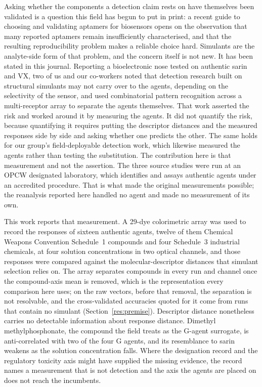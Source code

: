 \documentclass[journal=jacsat,manuscript=article,margin=1in]{achemso}
\begin{document}
Asking whether the components a detection claim rests on have themselves
been validated is a question this field has begun to put in print: a recent
guide to choosing and validating aptamers for biosensors opens on the
observation that many reported aptamers remain insufficiently characterised,
and that the resulting reproducibility problem makes a reliable choice
hard.\cite{chen2026aptamer} Simulants are the analyte-side form of that
problem, and the concern itself is not new. It has been stated in this
journal.
Reporting a bioelectronic nose tested on authentic sarin and VX, two of us
and our co-workers noted that detection research built on structural
simulants may not carry over to the agents, depending on the selectivity of
the sensor, and used combinatorial pattern recognition across a
multi-receptor array to separate the agents
themselves.\cite{yoo2025bioelectronic} That work asserted the risk and
worked around it by measuring the agents. It did not quantify the risk,
because quantifying it requires putting the descriptor distances and the
measured responses side by side and asking whether one predicts the other.
The same holds for our group's field-deployable detection work, which
likewise measured the agents rather than testing the
substitution.\cite{ondeviceref} The contribution here is that measurement
and not the assertion. The three source studies were run at an
OPCW designated laboratory, which identifies and assays authentic agents
under an accredited procedure. That is what made the original measurements
possible; the reanalysis reported here handled no agent and made no
measurement of its own.

This work reports that measurement. A 29-dye colorimetric array was used to
record the responses of sixteen authentic agents, twelve of them
Chemical Weapons Convention Schedule~1 compounds and four Schedule~3
industrial chemicals, at four solution concentrations in two optical
channels, and those responses were compared against the
molecular-descriptor distances that simulant selection relies on. The array separates compounds in every run and channel once the
compound-axis mean is removed, which is the representation every comparison
here uses; on the raw vectors, before that removal, the separation is not
resolvable, and the cross-validated accuracies quoted for it come from runs
that contain no simulant (Section~\ref{res:premise}).
Descriptor distance nonetheless carries no detectable information about
response distance. Dimethyl methylphosphonate, the compound the field treats
as the G-agent surrogate, is anti-correlated with two of the four G agents,
and its resemblance to sarin weakens as the solution concentration falls. Where the designation record and the regulatory
toxicity axis might have supplied the missing evidence, the record names a
measurement that is not detection and the axis the agents are placed on does
not reach the incumbents.
\end{document}
